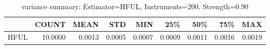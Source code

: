 \begin{table}[ht]
\centering
\caption{variance summary: Estimator=HFUL, Instruments=200, Strength=0.90}
\begin{tabular}{lrrrrrrrr}
\toprule
 & COUNT & MEAN & STD & MIN & 25\% & 50\% & 75\% & MAX \\
\midrule
HFUL & 10.0000 & 0.0013 & 0.0005 & 0.0007 & 0.0009 & 0.0011 & 0.0016 & 0.0019 \\
\bottomrule
\end{tabular}
\end{table}
